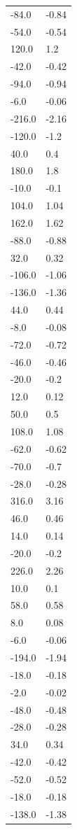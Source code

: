 \begin{longtable}{ll}
-84.0 & -0.84 \\
-54.0 & -0.54 \\
120.0 & 1.2 \\
-42.0 & -0.42 \\
-94.0 & -0.94 \\
-6.0 & -0.06 \\
-216.0 & -2.16 \\
-120.0 & -1.2 \\
40.0 & 0.4 \\
180.0 & 1.8 \\
-10.0 & -0.1 \\
104.0 & 1.04 \\
162.0 & 1.62 \\
-88.0 & -0.88 \\
32.0 & 0.32 \\
-106.0 & -1.06 \\
-136.0 & -1.36 \\
44.0 & 0.44 \\
-8.0 & -0.08 \\
-72.0 & -0.72 \\
-46.0 & -0.46 \\
-20.0 & -0.2 \\
12.0 & 0.12 \\
50.0 & 0.5 \\
108.0 & 1.08 \\
-62.0 & -0.62 \\
-70.0 & -0.7 \\
-28.0 & -0.28 \\
316.0 & 3.16 \\
46.0 & 0.46 \\
14.0 & 0.14 \\
-20.0 & -0.2 \\
226.0 & 2.26 \\
10.0 & 0.1 \\
58.0 & 0.58 \\
8.0 & 0.08 \\
-6.0 & -0.06 \\
-194.0 & -1.94 \\
-18.0 & -0.18 \\
-2.0 & -0.02 \\
-48.0 & -0.48 \\
-28.0 & -0.28 \\
34.0 & 0.34 \\
-42.0 & -0.42 \\
-52.0 & -0.52 \\
-18.0 & -0.18 \\
-138.0 & -1.38 \\

\end{longtable}
